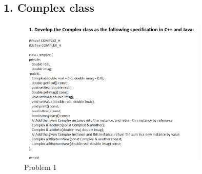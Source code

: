 \documentclass{article}
\begin{document}
\subsection*{1. Complex class}

\begin{figure}[H]
    \centering
    \includegraphics[width=0.8\textwidth]{./Assets/Task requirements/Assignment10/1.png}
    \caption{Problem 1}
\end{figure}
\end{document}
